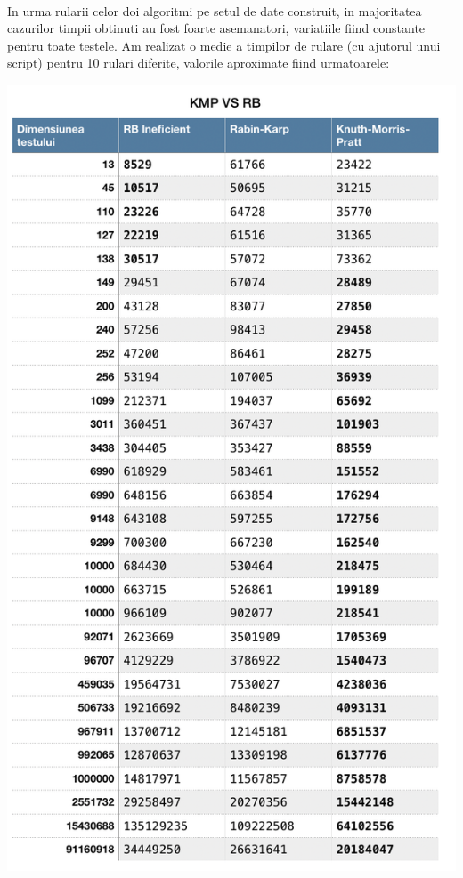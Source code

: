 \documentclass[runningheads]{llncs}
\begin{document}
\paragraph{} In urma rularii celor doi algoritmi pe setul de date construit, in majoritatea cazurilor timpii obtinuti au fost foarte asemanatori, variatiile fiind constante pentru toate testele. Am realizat o medie a timpilor de rulare (cu ajutorul unui script) pentru 10 rulari diferite, valorile aproximate fiind urmatoarele:
\begin{center}
\includegraphics[scale=0.5]{rezultate.png} \\
\end{center} 
\end{document}
